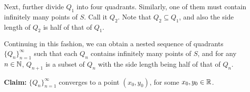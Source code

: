 \begin{enumerate}
\begin{pf}
Next, further divide \(Q_1\) into four quadrants. Similarly, one of them must
contain infinitely many points of \(S\). Call it \(Q_2\). Note that
\(Q_2\subseteq Q_1\), and also the side length of \(Q_2\) is half of that of
\(Q_1\).
\begin{center}
\end{center}
Continuing in this fashion, we can obtain a nested sequence of quadrants
\(\{Q_n\}_{n=1}^{\infty}\) such that each \(Q_n\) contains infinitely many
points of \(S\), and for any \(n\in\mathbb{N}\), \(Q_{n+1}\) is a subset of \(Q_n\)
with the side length being half of that of \(Q_n\).

\textbf{Claim:} \(\{Q_n\}_{n=1}^{\infty}\) converges to a point \((x_0,y_0)\),
for some \(x_0,y_0\in\mathbb{R}\).


\end{pf}
\end{enumerate}
